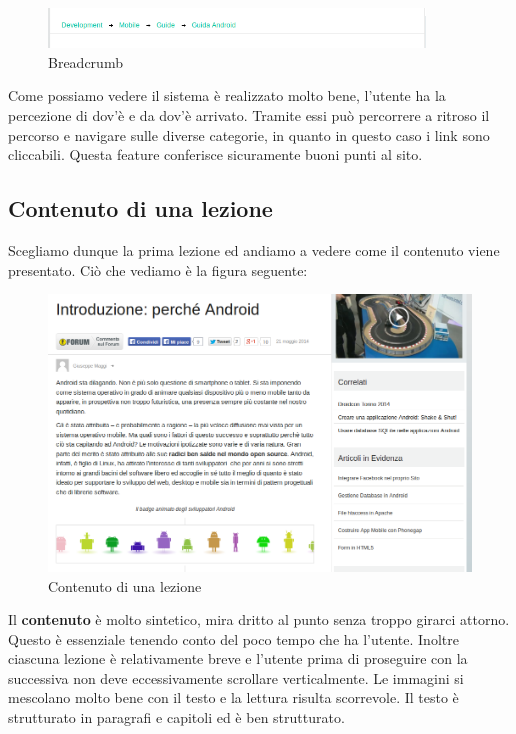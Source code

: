 \begin{figure}[H]
\centering
\includegraphics[width=100mm]{images/breadcrumb.png}
\caption{Breadcrumb}
\end{figure}

Come possiamo vedere il sistema è realizzato molto bene, l'utente ha la percezione di dov'è e da dov'è arrivato. Tramite essi può percorrere a ritroso il percorso e navigare sulle diverse categorie, in quanto in questo caso i link sono cliccabili. Questa feature conferisce sicuramente buoni punti al sito.

\subsection{Contenuto di una lezione}

Scegliamo dunque la prima lezione ed andiamo a vedere come il contenuto viene presentato. Ciò che vediamo è la figura seguente:

\begin{figure}[H]
\centering
\includegraphics[width=120mm]{images/internal3.png}
\caption{Contenuto di una lezione}
\end{figure}

Il \textbf{contenuto} è molto sintetico, mira dritto al punto senza troppo girarci attorno. Questo è essenziale tenendo conto del poco tempo che ha l'utente. Inoltre ciascuna lezione è relativamente breve e l'utente prima di proseguire con la successiva non deve eccessivamente scrollare verticalmente. Le immagini si mescolano molto bene con il testo e la lettura risulta scorrevole. Il testo è strutturato in paragrafi e capitoli ed è ben strutturato.

